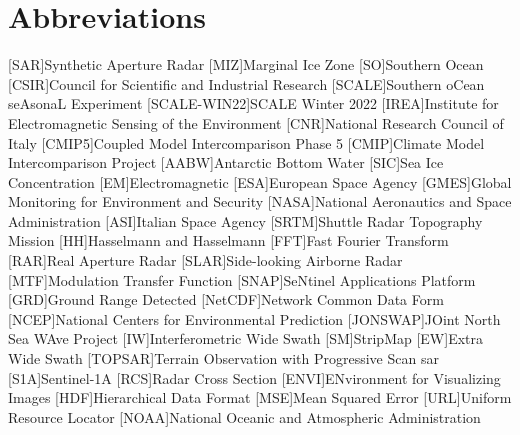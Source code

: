 \chapter*{Abbreviations}
\begin{acronym}
        [SAR]{Synthetic Aperture Radar}
        [MIZ]{Marginal Ice Zone}
        [SO]{Southern Ocean}
        [CSIR]{Council for Scientific and Industrial Research}
        [SCALE]{Southern oCean seAsonaL Experiment}
        [SCALE-WIN22]{SCALE Winter 2022}
        [IREA]{Institute for Electromagnetic Sensing of the Environment}
        [CNR]{National Research Council of Italy}
        [CMIP5]{Coupled Model Intercomparison Phase 5}
        [CMIP]{Climate Model Intercomparison Project}
        [AABW]{Antarctic Bottom Water}
        [SIC]{Sea Ice Concentration}
        [EM]{Electromagnetic}
        [ESA]{European Space Agency}
        [GMES]{Global Monitoring for Environment and Security}
        [NASA]{National Aeronautics and Space Administration}
        [ASI]{Italian Space Agency}
        [SRTM]{Shuttle Radar Topography Mission}
        [HH]{Hasselmann and Hasselmann}
        [FFT]{Fast Fourier Transform}
        [RAR]{Real Aperture Radar}
        [SLAR]{Side-looking Airborne Radar}
        [MTF]{Modulation Transfer Function}
        [SNAP]{SeNtinel Applications Platform}
        [GRD]{Ground Range Detected}
        [NetCDF]{Network Common Data Form}
        [NCEP]{National Centers for Environmental Prediction}
        [JONSWAP]{JOint North Sea WAve Project}
        [IW]{Interferometric Wide Swath}
        [SM]{StripMap}
        [EW]{Extra Wide Swath}
        [TOPSAR]{Terrain Observation with Progressive Scan \acs{sar}}
        [S1A]{Sentinel-1A}
        [RCS]{Radar Cross Section}
        [ENVI]{ENvironment for Visualizing Images}
        [HDF]{Hierarchical Data Format}
        [MSE]{Mean Squared Error}
        [URL]{Uniform Resource Locator}
        [NOAA]{National Oceanic and Atmospheric Administration}
\end{acronym}
